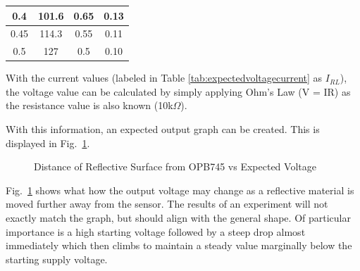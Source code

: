 \documentclass[conference]{IEEEtran}
\begin{document}
\begin{table}[H]
\begin{tabular}{|cc|cc|}
    \multicolumn{1}{|c|}{0.4}                    & 101.6                  & \multicolumn{1}{c|}{0.65}                   & 0.13                                                             \\ \hline
    \multicolumn{1}{|c|}{0.45}                   & 114.3                  & \multicolumn{1}{c|}{0.55}                   & 0.11                                                             \\ \hline
    \multicolumn{1}{|c|}{0.5}                    & 127                    & \multicolumn{1}{c|}{0.5}                    & 0.10                                                             \\ \hline
    \end{tabular}
\end{table}


With the current values (labeled in Table \ref{tab:expectedvoltagecurrent} as $I_{RL}$), the voltage value can be calculated by simply applying Ohm's Law (V = IR) as the resistance value is also known (10k$\Omega$).

With this information, an expected output graph can be created. This is displayed in Fig.~\ref{fig:expectedvoltage}.
\begin{figure}[htbp]
    \caption{Distance of Reflective Surface from OPB745 vs Expected Voltage}
    \label{fig:expectedvoltage}
\end{figure}

Fig.~\ref{fig:expectedvoltage} shows what how the output voltage may change as a reflective material is moved further away from the
sensor. The results of an experiment will not exactly match the graph, but should align with the general shape. Of particular
importance is a high starting voltage followed by a steep drop almost immediately which then climbs to maintain a steady value
marginally below the starting supply voltage.
\end{document}
